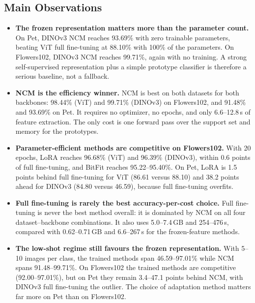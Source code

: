\documentclass[journal,11pt]{IEEEtran}
\begin{document}
\subsection{Main Observations}
\begin{itemize}
  \setlength{\itemsep}{3pt}
  \item \textbf{The frozen representation matters more than the parameter count.} On Pet, DINOv3 NCM reaches 93.69\% with zero trainable parameters, beating ViT full fine-tuning at 88.10\% with 100\% of the parameters. On Flowers102, DINOv3 NCM reaches 99.71\%, again with no training. A strong self-supervised representation plus a simple prototype classifier is therefore a serious baseline, not a fallback.
  \item \textbf{NCM is the efficiency winner.} NCM is best on both datasets for both backbones: 98.44\% (ViT) and 99.71\% (DINOv3) on Flowers102, and 91.48\% and 93.69\% on Pet. It requires no optimizer, no epochs, and only 6.6--12.8\,s of feature extraction. The only cost is one forward pass over the support set and memory for the prototypes.
  \item \textbf{Parameter-efficient methods are competitive on Flowers102.} With 20 epochs, LoRA reaches 96.68\% (ViT) and 96.39\% (DINOv3), within 0.6 points of full fine-tuning, and BitFit reaches 95.22--95.40\%. On Pet, LoRA is 1.5 points behind full fine-tuning for ViT (86.61 versus 88.10) and 38.2 points ahead for DINOv3 (84.80 versus 46.59), because full fine-tuning overfits.
  \item \textbf{Full fine-tuning is rarely the best accuracy-per-cost choice.} Full fine-tuning is never the best method overall: it is dominated by NCM on all four dataset--backbone combinations. It also uses 5.0--7.4\,GB and 254--476\,s, compared with 0.62--0.71\,GB and 6.6--267\,s for the frozen-feature methods.
  \item \textbf{The low-shot regime still favours the frozen representation.} With 5--10 images per class, the trained methods span 46.59--97.01\% while NCM spans 91.48--99.71\%. On Flowers102 the trained methods are competitive (92.00--97.01\%), but on Pet they remain 3.4--47.1 points behind NCM, with DINOv3 full fine-tuning the outlier. The choice of adaptation method matters far more on Pet than on Flowers102.
\end{itemize}
\end{document}
